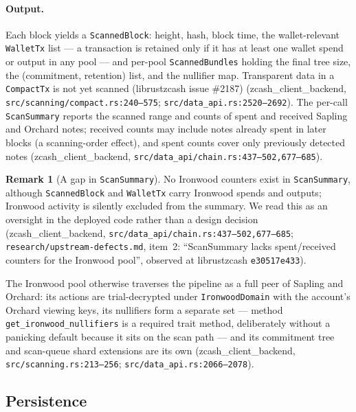 \documentclass[11pt,a4paper]{article}
\theoremstyle{definition}
\newtheorem{remark}[theorem]{Remark}
\begin{document}
\paragraph{Output.} Each block yields a \texttt{ScannedBlock}: height,
hash, block time, the wallet-relevant \texttt{WalletTx} list --- a
transaction is retained only if it has at least one wallet spend or output
in any pool --- and per-pool \texttt{ScannedBundles} holding the final tree
size, the (commitment, retention) list, and the nullifier map. Transparent
data in a \texttt{CompactTx} is not yet scanned (\textsf{librustzcash}
issue \#2187)
(\textsf{zcash\_client\_backend}, \texttt{src/scanning/compact.rs:240--575};
\texttt{src/data\_api.rs:2520--2692}). The per-call \texttt{ScanSummary}
reports the scanned range and counts of spent and received Sapling and
Orchard notes; received counts may include notes already spent in later
blocks (a scanning-order effect), and spent counts cover only previously
detected notes
(\textsf{zcash\_client\_backend},
\texttt{src/data\_api/chain.rs:437--502,677--685}).

\begin{remark}[A gap in \texttt{ScanSummary}]\label{rem:sync-summary-gap}
No Ironwood counters exist in \texttt{ScanSummary}, although
\texttt{ScannedBlock} and \texttt{WalletTx} carry Ironwood spends and
outputs; Ironwood activity is silently excluded from the summary. We read
this as an oversight in the deployed code rather than a design decision
(\textsf{zcash\_client\_backend},
\texttt{src/data\_api/chain.rs:437--502,677--685};
\texttt{research/upstream-defects.md}, item~2: ``ScanSummary lacks
spent/received counters for the Ironwood pool'', observed at
\textsf{librustzcash} \texttt{e30517e433}).
\end{remark}

The Ironwood pool otherwise traverses the pipeline as a full peer of
Sapling and Orchard: its actions are trial-decrypted under
\texttt{IronwoodDomain} with the account's Orchard viewing keys, its
nullifiers form a separate set --- method \texttt{get\_ironwood\_nullifiers}
is a required trait method, deliberately without a panicking default
because it sits on the scan path --- and its commitment tree and scan-queue
shard extensions are its own
(\textsf{zcash\_client\_backend}, \texttt{src/scanning.rs:213--256};
\texttt{src/data\_api.rs:2066--2078}).

\subsection{Persistence}\label{sec:sync-persist}
\end{document}
